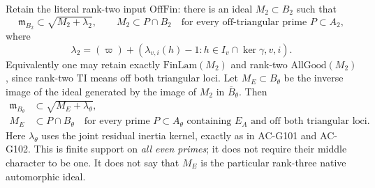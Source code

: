 \begin{theorem}
\label{AC-G106-even}
Retain the literal rank-two input \(\mathrm{OffFin}\): there is
an ideal \(M_2\subset B_2\) such that
\[
 \mathfrak m_{B_2}\subset\sqrt{M_2+\lambda_2},\qquad
 M_2\subset P\cap B_2
   \quad\text{for every off-triangular prime }P\subset A_2,
 \tag{G106.11}
\]
where
\[
 \lambda_2=(\varpi)+
 (\lambda_{v,i}(h)-1:h\in I_v\cap\ker\gamma, v,i).
 \tag{G106.12}
\]
Equivalently one may retain exactly \(\mathrm{FinLam}(M_2)\)
and rank-two \(\mathrm{AllGood}(M_2)\), since rank-two
\(\mathrm{TI}\) means off both triangular loci.
Let \(M_E\subset B_\theta\) be the inverse image of the ideal
generated by the image of \(M_2\) in \(\overline B_\theta\).
Then
\[
 \begin{split}
 \mathfrak m_{B_\theta}&\subset
                \sqrt{M_E+\lambda_\theta},\\
 M_E&\subset P\cap B_\theta
 \quad\text{for every prime }P\subset A_\theta
       \text{ containing }E_A\text{ and off both triangular loci}.
 \end{split}
 \tag{G106.13}
\]
Here \(\lambda_\theta\) uses the joint residual inertia kernel,
exactly as in AC-G101 and AC-G102.  This is finite support on
\emph{all even primes}; it does not require their middle character
to be one.  It does not say that \(M_E\) is the particular
rank-three native automorphic ideal.
\end{theorem}

